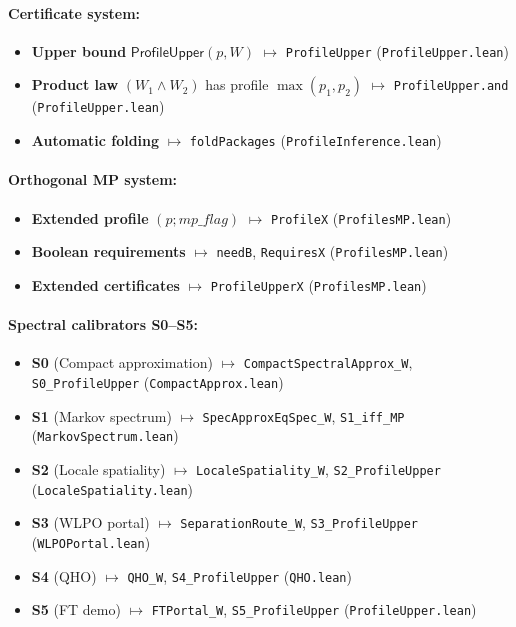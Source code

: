 \documentclass[11pt]{article}
\newcommand{\lean}[1]{\texttt{#1}}
\theoremstyle{plain}
\theoremstyle{definition}
\theoremstyle{remark}
\newcommand{\ProfileUpper}{\mathsf{ProfileUpper}}
\begin{document}
\paragraph{Certificate system:}
\begin{itemize}
\item \textbf{Upper bound} $\ProfileUpper(p,W)$ $\mapsto$ \lean{ProfileUpper} (\texttt{ProfileUpper.lean})
\item \textbf{Product law} $(W_1 \land W_2)$ has profile $\max(p_1,p_2)$ $\mapsto$ \lean{ProfileUpper.and} (\texttt{ProfileUpper.lean})
\item \textbf{Automatic folding} $\mapsto$ \lean{foldPackages} (\texttt{ProfileInference.lean})
\end{itemize}

\paragraph{Orthogonal MP system:}
\begin{itemize}
\item \textbf{Extended profile} $(p; \mathit{mp\_flag})$ $\mapsto$ \lean{ProfileX} (\texttt{ProfilesMP.lean})
\item \textbf{Boolean requirements} $\mapsto$ \lean{needB}, \lean{RequiresX} (\texttt{ProfilesMP.lean})
\item \textbf{Extended certificates} $\mapsto$ \lean{ProfileUpperX} (\texttt{ProfilesMP.lean})
\end{itemize}

\paragraph{Spectral calibrators S0--S5:}
\begin{itemize}
\item \textbf{S0} (Compact approximation) $\mapsto$ \lean{CompactSpectralApprox\_W}, \lean{S0\_ProfileUpper} (\texttt{CompactApprox.lean})
\item \textbf{S1} (Markov spectrum) $\mapsto$ \lean{SpecApproxEqSpec\_W}, \lean{S1\_iff\_MP} (\texttt{MarkovSpectrum.lean})
\item \textbf{S2} (Locale spatiality) $\mapsto$ \lean{LocaleSpatiality\_W}, \lean{S2\_ProfileUpper} (\texttt{LocaleSpatiality.lean})
\item \textbf{S3} (WLPO portal) $\mapsto$ \lean{SeparationRoute\_W}, \lean{S3\_ProfileUpper} (\texttt{WLPOPortal.lean})
\item \textbf{S4} (QHO) $\mapsto$ \lean{QHO\_W}, \lean{S4\_ProfileUpper} (\texttt{QHO.lean})
\item \textbf{S5} (FT demo) $\mapsto$ \lean{FTPortal\_W}, \lean{S5\_ProfileUpper} (\texttt{ProfileUpper.lean})
\end{itemize}
\end{document}
